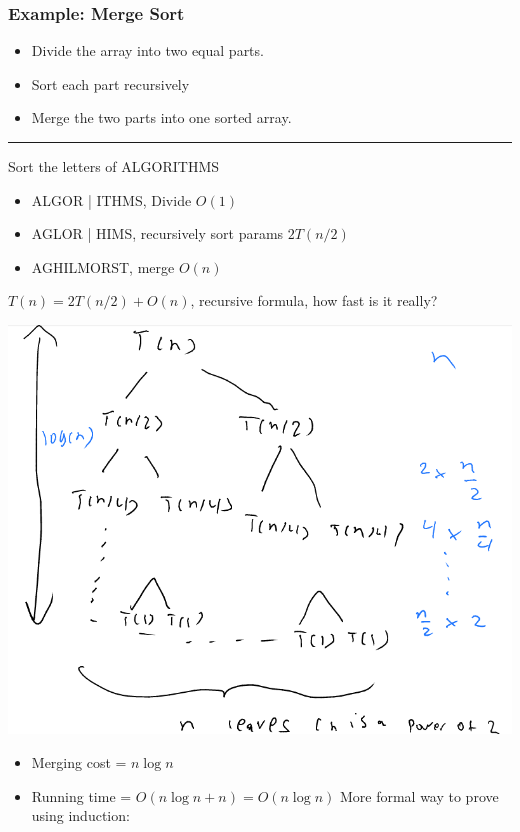 \documentclass[11pt]{article}
\begin{document}
\subsubsection{Example: Merge Sort}
\label{sec:org893afa1}
\begin{itemize}
\item Divide the array into two equal parts.
\item Sort each part recursively
\item Merge the two parts into one sorted array.
\end{itemize}

\noindent\rule{\textwidth}{0.5pt}
Sort the letters of ALGORITHMS
\begin{itemize}
\item ALGOR | ITHMS, Divide \(O(1)\)
\item AGLOR | HIMS, recursively sort params \(2T(n/2)\)
\item AGHILMORST, merge \(O(n)\)
\end{itemize}
\(T(n)=2T(n/2)+O(n)\), recursive formula, how fast is it really?
\begin{center}
\includegraphics[width=.9\linewidth]{./Images/i69.png}
\end{center}
\begin{itemize}
\item Merging cost = \(n \log n\)
\item Running time = \(O(n\log n +n)=O(n \log n)\)
More formal way to prove using induction:
\end{itemize}
\end{document}
